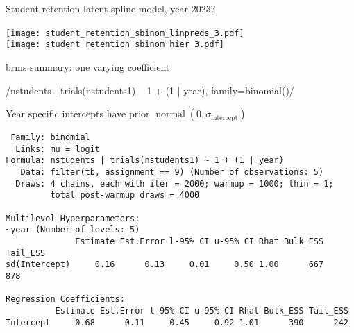 \documentclass[finnish,english,t]{beamer}
\DeclareMathOperator{\normal}{normal}
\begin{document}
\begin{frame}{Student retention latent spline model, year 2023?}

  \vspace{-0.5\baselineskip}
  \hspace{-8mm}\texttt{[image: student\_retention\_sbinom\_linpreds\_3.pdf]}
  {\\\hspace{-5mm}\texttt{[image: student\_retention\_sbinom\_hier\_3.pdf]}}

\end{frame}

\begin{frame}[fragile]{brms summary: one varying coefficient}

{  \footnotesize
\rinline/nstudents | trials(nstudents1) ~ 1 + (1 | year), family=binomial()/
}

Year specific intercepts have prior $\normal(0, \sigma_\mathrm{intercept})$

\vspace{-\baselineskip}
{\color{lightgray}\hrulefill}

{  \footnotesize
\begin{verbatim}
 Family: binomial 
  Links: mu = logit 
Formula: nstudents | trials(nstudents1) ~ 1 + (1 | year) 
   Data: filter(tb, assignment == 9) (Number of observations: 5) 
  Draws: 4 chains, each with iter = 2000; warmup = 1000; thin = 1;
         total post-warmup draws = 4000

Multilevel Hyperparameters:
~year (Number of levels: 5) 
              Estimate Est.Error l-95% CI u-95% CI Rhat Bulk_ESS Tail_ESS
sd(Intercept)     0.16      0.13     0.01     0.50 1.00      667      878

Regression Coefficients:
          Estimate Est.Error l-95% CI u-95% CI Rhat Bulk_ESS Tail_ESS
Intercept     0.68      0.11     0.45     0.92 1.01      390      242
\end{verbatim}
}

\end{frame}
\end{document}
